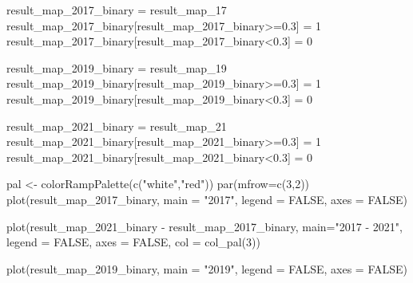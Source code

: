 \documentclass[
]{article}
\newenvironment{Shaded}{\begin{snugshade}}{\end{snugshade}}
\newcommand{\AttributeTok}[1]{\textcolor[rgb]{0.77,0.63,0.00}{#1}}
\newcommand{\ConstantTok}[1]{\textcolor[rgb]{0.00,0.00,0.00}{#1}}
\newcommand{\DecValTok}[1]{\textcolor[rgb]{0.00,0.00,0.81}{#1}}
\newcommand{\FloatTok}[1]{\textcolor[rgb]{0.00,0.00,0.81}{#1}}
\newcommand{\FunctionTok}[1]{\textcolor[rgb]{0.00,0.00,0.00}{#1}}
\newcommand{\NormalTok}[1]{#1}
\newcommand{\OtherTok}[1]{\textcolor[rgb]{0.56,0.35,0.01}{#1}}
\newcommand{\SpecialCharTok}[1]{\textcolor[rgb]{0.00,0.00,0.00}{#1}}
\newcommand{\StringTok}[1]{\textcolor[rgb]{0.31,0.60,0.02}{#1}}
\begin{document}
\begin{Shaded}
\begin{Highlighting}[]
\NormalTok{result\_map\_2017\_binary }\OtherTok{=}\NormalTok{ result\_map\_17}
\NormalTok{result\_map\_2017\_binary[result\_map\_2017\_binary}\SpecialCharTok{\textgreater{}=}\FloatTok{0.3}\NormalTok{] }\OtherTok{=} \DecValTok{1}
\NormalTok{result\_map\_2017\_binary[result\_map\_2017\_binary}\SpecialCharTok{\textless{}}\FloatTok{0.3}\NormalTok{] }\OtherTok{=} \DecValTok{0}

\NormalTok{result\_map\_2019\_binary }\OtherTok{=}\NormalTok{ result\_map\_19}
\NormalTok{result\_map\_2019\_binary[result\_map\_2019\_binary}\SpecialCharTok{\textgreater{}=}\FloatTok{0.3}\NormalTok{] }\OtherTok{=} \DecValTok{1}
\NormalTok{result\_map\_2019\_binary[result\_map\_2019\_binary}\SpecialCharTok{\textless{}}\FloatTok{0.3}\NormalTok{] }\OtherTok{=} \DecValTok{0}

\NormalTok{result\_map\_2021\_binary }\OtherTok{=}\NormalTok{ result\_map\_21}
\NormalTok{result\_map\_2021\_binary[result\_map\_2021\_binary}\SpecialCharTok{\textgreater{}=}\FloatTok{0.3}\NormalTok{] }\OtherTok{=} \DecValTok{1}
\NormalTok{result\_map\_2021\_binary[result\_map\_2021\_binary}\SpecialCharTok{\textless{}}\FloatTok{0.3}\NormalTok{] }\OtherTok{=} \DecValTok{0}

\NormalTok{pal }\OtherTok{\textless{}{-}} \FunctionTok{colorRampPalette}\NormalTok{(}\FunctionTok{c}\NormalTok{(}\StringTok{"white"}\NormalTok{,}\StringTok{"red"}\NormalTok{))}
\FunctionTok{par}\NormalTok{(}\AttributeTok{mfrow=}\FunctionTok{c}\NormalTok{(}\DecValTok{3}\NormalTok{,}\DecValTok{2}\NormalTok{))}
\FunctionTok{plot}\NormalTok{(result\_map\_2017\_binary, }\AttributeTok{main =} \StringTok{"2017"}\NormalTok{, }\AttributeTok{legend =} \ConstantTok{FALSE}\NormalTok{, }\AttributeTok{axes =} \ConstantTok{FALSE}\NormalTok{)}

\FunctionTok{plot}\NormalTok{(result\_map\_2021\_binary }\SpecialCharTok{{-}}\NormalTok{ result\_map\_2017\_binary, }\AttributeTok{main=}\StringTok{"2017 {-} 2021"}\NormalTok{, }
     \AttributeTok{legend =} \ConstantTok{FALSE}\NormalTok{, }\AttributeTok{axes =} \ConstantTok{FALSE}\NormalTok{, }\AttributeTok{col =} \FunctionTok{col\_pal}\NormalTok{(}\DecValTok{3}\NormalTok{))}

\FunctionTok{plot}\NormalTok{(result\_map\_2019\_binary, }\AttributeTok{main =} \StringTok{"2019"}\NormalTok{, }\AttributeTok{legend =} \ConstantTok{FALSE}\NormalTok{, }\AttributeTok{axes =} \ConstantTok{FALSE}\NormalTok{)}


\end{Highlighting}
\end{Shaded}
\end{document}
